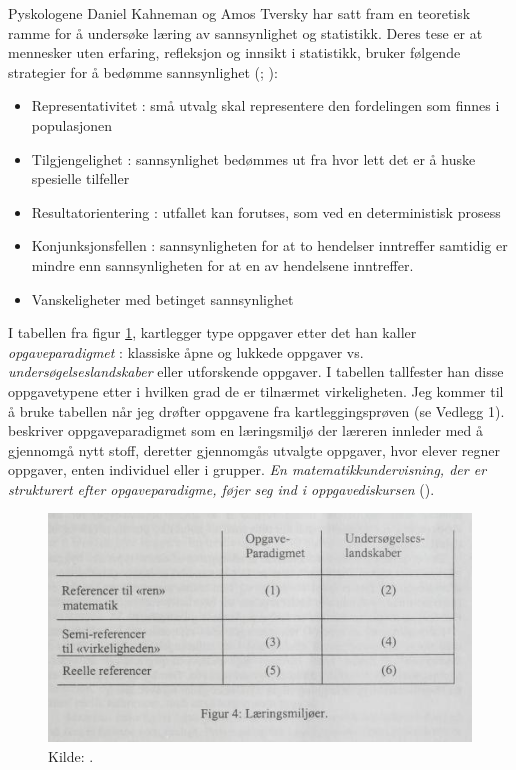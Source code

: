 \documentclass[main.tex]{subfiles}
\begin{document}
Pyskologene Daniel Kahneman og Amos Tversky har satt fram en teoretisk ramme for å undersøke 
læring av sannsynlighet og statistikk. Deres tese er at mennesker uten erfaring, refleksjon og innsikt i statistikk,
bruker følgende strategier for å bedømme sannsynlighet (; ):
\begin{itemize}
\item Representativitet : små utvalg skal representere den fordelingen som finnes i populasjonen
\item Tilgjengelighet : sannsynlighet bedømmes ut fra hvor lett det er å huske spesielle tilfeller
\item Resultatorientering : utfallet kan forutses, som ved en deterministisk prosess
\item Konjunksjonsfellen : sannsynligheten for at to hendelser inntreffer samtidig er mindre enn sannsynligheten
for at en av hendelsene inntreffer.
\item Vanskeligheter med betinget sannsynlighet
\end{itemize}
I tabellen fra figur \ref{fig:skov98}, kartlegger  type oppgaver etter det han kaller 
\emph{opgaveparadigmet} :
klassiske åpne og lukkede oppgaver vs. \emph{undersøgelseslandskaber} eller utforskende oppgaver. I tabellen tallfester
han disse oppgavetypene etter i hvilken grad de er tilnærmet virkeligheten. Jeg kommer til å bruke tabellen når jeg
drøfter oppgavene fra kartleggingsprøven (se Vedlegg 1).  beskriver oppgaveparadigmet som
en læringsmiljø der læreren innleder med å gjennomgå nytt stoff, deretter gjennomgås utvalgte oppgaver, hvor elever 
regner oppgaver, enten individuel eller i grupper. \emph{En matematikkundervisning, der er strukturert efter 
opgaveparadigme, føjer seg ind i \guillemotleft oppgavediskursen\guillemotright} ().
\begin{figure}[h!]
\centering
\includegraphics[scale = 0.9]{../figures/laeringsmiljoer.png}
\caption{Kilde: \protect{}.}
\label{fig:skov98}
\end{figure}
\end{document}
